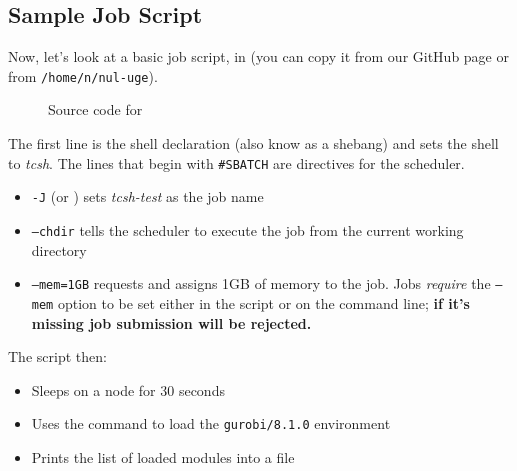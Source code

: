\subsection{Sample Job Script}

Now, let's look at a basic job script,  in 
(you can copy it from our GitHub page or from \texttt{/home/n/nul-uge}).

\begin{figure}[htpb]
	
	\caption{Source code for }
	\label{fig:tcsh.sh}
\end{figure}

The first line is the shell declaration (also know as a shebang) and sets the shell to \emph{tcsh}.
The lines that begin with \texttt{\#SBATCH} are directives for the scheduler.

\begin{itemize}
	\item \texttt{-J} (or ) sets \emph{tcsh-test} as the job name
	\item \texttt{--chdir} tells the scheduler to execute the job from the current working directory
	\item \texttt{--mem=1GB} requests and assigns 1GB of memory to the job. 
	Jobs \emph{require} the \texttt{--mem} option to be set either in the script
	or on the command line; \textbf{if it's missing job submission will be rejected.}
\end{itemize}

The script then:

\begin{itemize}
	\item Sleeps on a node for 30 seconds
	\item Uses the  command to load the \texttt{gurobi/8.1.0} environment
	\item Prints the list of loaded modules into a file
\end{itemize}

